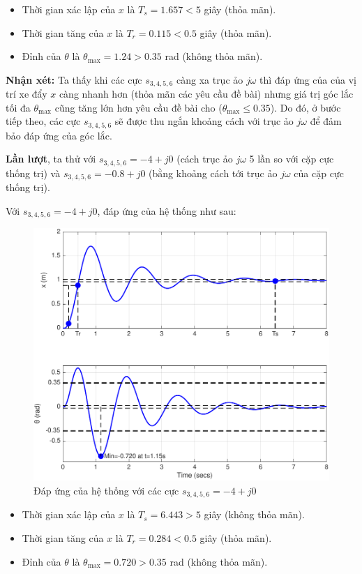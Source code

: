 \documentclass[12pt,a4paper]{article}
\begin{document}
\newpage

\begin{itemize}
    \item Thời gian xác lập của $x$ là $T_s = 1.657 < 5$ giây (thỏa mãn).
    \item Thời gian tăng của $x$ là $T_r = 0.115 < 0.5$ giây (thỏa mãn).
    \item Đỉnh của $\theta$ là $\theta_{\max} = 1.24 > 0.35$ rad (không thỏa mãn).
\end{itemize}

\textbf{Nhận xét:} Ta thấy khi các cực $s_{3,4,5,6}$ càng xa trục ảo $j\omega$ thì đáp ứng của của vị trí xe đẩy $x$ càng nhanh hơn (thỏa mãn các yêu cầu đề bài) nhưng giá trị góc lắc tối đa $\theta_{\max}$ cũng tăng lớn hơn yêu cầu đề bài cho ($\theta_{\max} \le 0.35$). Do đó, ở bước tiếp theo, các cực $s_{3,4,5,6}$ sẽ được thu ngắn khoảng cách với trục ảo $j\omega$ để đảm bảo đáp ứng của góc lắc.

\textbf{Lần lượt}, ta thử với $s_{3,4,5,6}=-4+j0$ (cách trục ảo $j\omega$ 5 lần so với cặp cực thống trị) và $s_{3,4,5,6}=-0.8+j0 $ (bằng khoảng cách tới trục ảo $j\omega$ của cặp cực thống trị).

Với $s_{3,4,5,6}=-4+j0$, đáp ứng của hệ thống như sau:

\begin{figure}[ht]
    \centering
    \includegraphics[width=0.75\linewidth]{ss5.pdf}
    \caption{Đáp ứng của hệ thống với các cực $s_{3,4,5,6} = -4 +j0$}
\end{figure}

\begin{itemize}
    \item Thời gian xác lập của $x$ là $T_s = 6.443 > 5$ giây (không thỏa mãn).
    \item Thời gian tăng của $x$ là $T_r = 0.284 < 0.5$ giây (thỏa mãn).
    \item Đỉnh của $\theta$ là $\theta_{\max} = 0.720 > 0.35$ rad (không thỏa mãn).
\end{itemize}
\end{document}
